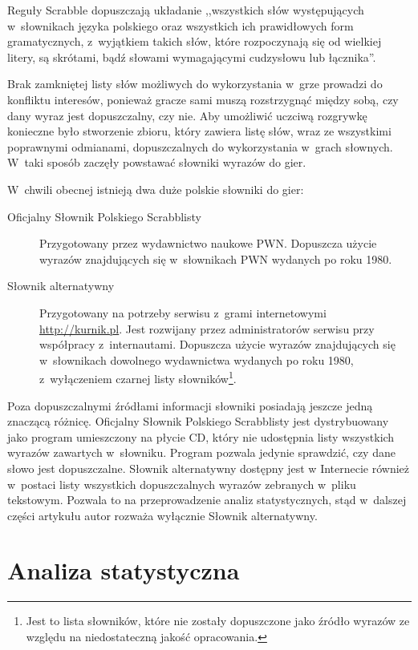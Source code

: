 \documentclass[a4paper,twocolumn,12pt]{article}
\theoremstyle{definition}
\begin{document}
Reguły Scrabble dopuszczają układanie ,,wszystkich słów występujących w~słownikach języka polskiego oraz wszystkich ich prawidłowych form gramatycznych, z~wyjątkiem takich słów, które rozpoczynają się od wielkiej litery, są skrótami, bądź słowami wymagającymi cudzysłowu lub łącznika''. \cite{scrabble_word_rules} 

Brak zamkniętej listy słów możliwych do wykorzystania w~grze prowadzi do konfliktu interesów, ponieważ gracze sami muszą rozstrzygnąć między sobą, czy dany wyraz jest dopuszczalny, czy nie. Aby umożliwić uczciwą rozgrywkę konieczne było stworzenie zbioru, który zawiera listę słów, wraz ze wszystkimi poprawnymi odmianami, dopuszczalnych do wykorzystania w~grach słownych. W~taki sposób zaczęły powstawać słowniki wyrazów do gier. \cite{game_dictionary_definition}

W~chwili obecnej istnieją dwa duże polskie słowniki do gier:

\begin{description}
 \item [Oficjalny Słownik Polskiego Scrabblisty] Przygotowany przez wydawnictwo naukowe PWN. Dopuszcza użycie wyrazów znajdujących się w~słownikach PWN wydanych po roku 1980.
 \item[Słownik alternatywny] Przygotowany na potrzeby serwisu z~grami internetowymi \url{http://kurnik.pl}. Jest rozwijany przez administratorów serwisu przy współpracy z~internautami. Dopuszcza użycie wyrazów znajdujących się w~słownikach dowolnego wydawnictwa wydanych po roku 1980, z~wyłączeniem czarnej listy słowników\footnote{Jest to lista słowników, które nie zostały dopuszczone jako źródło wyrazów ze względu na niedostateczną jakość opracowania.}. 
\end{description}

Poza dopuszczalnymi źródłami informacji słowniki posiadają jeszcze jedną znaczącą różnicę. Oficjalny Słownik Polskiego Scrabblisty jest dystrybuowany jako program umieszczony na płycie CD, który nie udostępnia listy wszystkich wyrazów zawartych w~słowniku. Program pozwala jedynie sprawdzić, czy dane słowo jest dopuszczalne. Słownik alternatywny dostępny jest w Internecie również w~postaci listy wszystkich dopuszczalnych wyrazów zebranych w~pliku tekstowym. Pozwala to na przeprowadzenie analiz statystycznych, stąd w~dalszej części artykułu autor rozważa wyłącznie Słownik alternatywny.

\section*{Analiza statystyczna}
\end{document}

